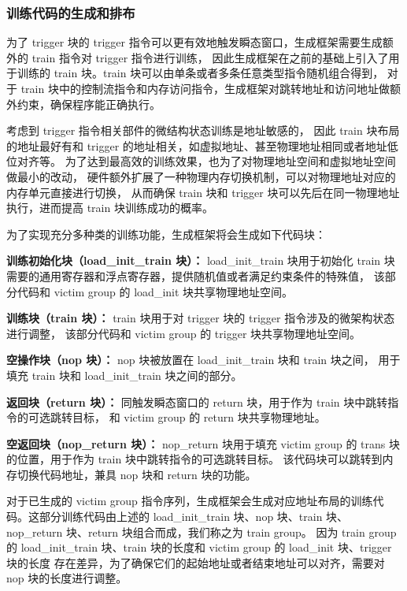 \subsubsection{训练代码的生成和排布}

为了 trigger 块的 trigger 指令可以更有效地触发瞬态窗口，生成框架需要生成额外的 train 指令对 trigger 指令进行训练，
因此生成框架在之前的基础上引入了用于训练的 train 块。train 块可以由单条或者多条任意类型指令随机组合得到，
对于 train 块中的控制流指令和内存访问指令，生成框架对跳转地址和访问地址做额外约束，确保程序能正确执行。\par

考虑到 trigger 指令相关部件的微结构状态训练是地址敏感的，
因此 train 块布局的地址最好有和 trigger 的地址相关，如虚拟地址、甚至物理地址相同或者地址低位对齐等。
为了达到最高效的训练效果，也为了对物理地址空间和虚拟地址空间做最小的改动，
硬件额外扩展了一种物理内存切换机制，可以对物理地址对应的内存单元直接进行切换，
从而确保 train 块和 trigger 块可以先后在同一物理地址执行，进而提高 train 块训练成功的概率。\par

为了实现充分多种类的训练功能，生成框架将会生成如下代码块：\par

\textbf{训练初始化块（load\_init\_train 块）：}
load\_init\_train 块用于初始化 train 块需要的通用寄存器和浮点寄存器，提供随机值或者满足约束条件的特殊值，
该部分代码和 victim group 的 load\_init 块共享物理地址空间。\par

\textbf{训练块（train 块）：}
train 块用于对 trigger 块的 trigger 指令涉及的微架构状态进行调整，
该部分代码和 victim group 的 trigger 块共享物理地址空间。

\textbf{空操作块（nop 块）：}
nop 块被放置在 load\_init\_train 块和 train 块之间，
用于填充 train 块和 load\_init\_train 块之间的部分。\par

\textbf{返回块（return 块）：}
同触发瞬态窗口的 return 块，用于作为 train 块中跳转指令的可选跳转目标，
和 victim group 的 return 块共享物理地址。\par

\textbf{空返回块（nop\_return 块）：}
nop\_return 块用于填充 victim group 的 trans 块的位置，用于作为 train 块中跳转指令的可选跳转目标。
该代码块可以跳转到内存切换代码地址，兼具 nop 块和 return 块的功能。\par

对于已生成的 victim group 指令序列，生成框架会生成对应地址布局的训练代码。这部分训练代码由上述的
load\_init\_train 块、nop 块、train 块、nop\_return 块、return 块组合而成，我们称之为 train group。
因为 train group 的 load\_init\_train 块、train 块的长度和 victim group 的 load\_init 块、trigger 块的长度
存在差异，为了确保它们的起始地址或者结束地址可以对齐，需要对 nop 块的长度进行调整。\par

